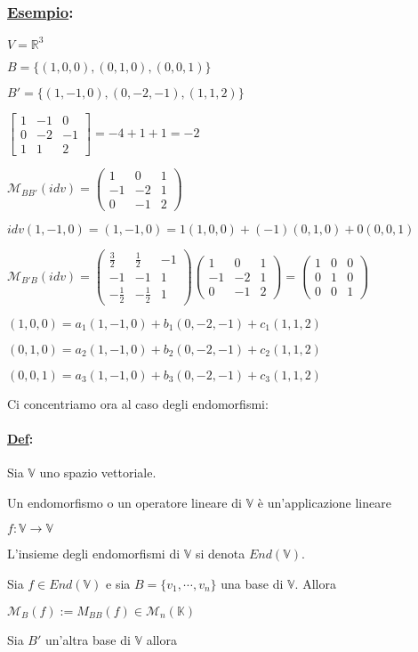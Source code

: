 \documentclass{article}
\newcommand{\ul}[1]{\underline{#1}}
\newcommand{\K}{\mathbb{K}}
\newcommand{\R}{\mathbb{R}}
\newcommand{\V}{\mathbb{V}}
\newcommand{\M}{\mathcal{M}}
\newcommand{\Def}[2]{\paragraph{\ul{Def}:}#1\\\hspace*{3em}\begin{minipage}{.8\textwidth}#2\end{minipage}}
\newcommand{\Esempio}[1]{\subsubsection*{\ul{Esempio}:}#1}
\begin{document}
\Esempio{
	$V=\R^3$

	$B=\{(1,0,0),(0,1,0),(0,0,1)\}$

	$B'=\{(1,-1,0),(0,-2,-1),(1,1,2)\}$

	$\begin{bmatrix}
			1 & -1 & 0  \\
			0 & -2 & -1 \\
			1 & 1  & 2
		\end{bmatrix}=-4+1+1=-2$

	$\M_{BB'}(idv)=\begin{pmatrix}
			1  & 0  & 1 \\
			-1 & -2 & 1 \\
			0  & -1 & 2
		\end{pmatrix}$

	$idv(1,-1,0)=(1,-1,0)=1(1,0,0)+(-1)(0,1,0)+0(0,0,1)$

	$\M_{B'B}(idv)=\begin{pmatrix}
			\frac{3}{2}  & \frac{1}{2}  & -1 \\
			-1           & -1           & 1  \\
			-\frac{1}{2} & -\frac{1}{2} & 1
		\end{pmatrix}\begin{pmatrix}
			1  & 0  & 1 \\
			-1 & -2 & 1 \\
			0  & -1 & 2
		\end{pmatrix}=\begin{pmatrix}
			1 & 0 & 0 \\
			0 & 1 & 0 \\
			0 & 0 & 1
		\end{pmatrix}$

	$(1,0,0)=a_1(1,-1,0)+b_1(0,-2,-1)+c_1(1,1,2)$

	$(0,1,0)=a_2(1,-1,0)+b_2(0,-2,-1)+c_2(1,1,2)$

	$(0,0,1)=a_3(1,-1,0)+b_3(0,-2,-1)+c_3(1,1,2)$
}

Ci concentriamo ora al caso degli endomorfismi:
\Def{Sia $\V$ uno spazio vettoriale.}{
	Un endomorfismo o un operatore lineare di $\V$ è un'applicazione lineare

	$f:\V\rightarrow\V$

	L'insieme degli endomorfismi di $\V$ si denota $End(\V)$.
}

Sia $f\in End(\V)$ e sia $B=\{v_1,\cdots,v_n\}$ una base di $\V$. Allora

$\M_B(f):=M_{BB}(f)\in\M_n(\K)$

Sia $B'$ un'altra base di $\V$ allora
\end{document}
